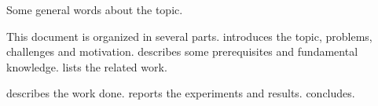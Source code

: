 
Some general words about the topic.



This document is organized in several parts.
 introduces the topic, problems, challenges and motivation.
 describes some prerequisites and fundamental knowledge.
 lists the related work.

 describes the work done.
 reports the experiments and results.
 concludes.
